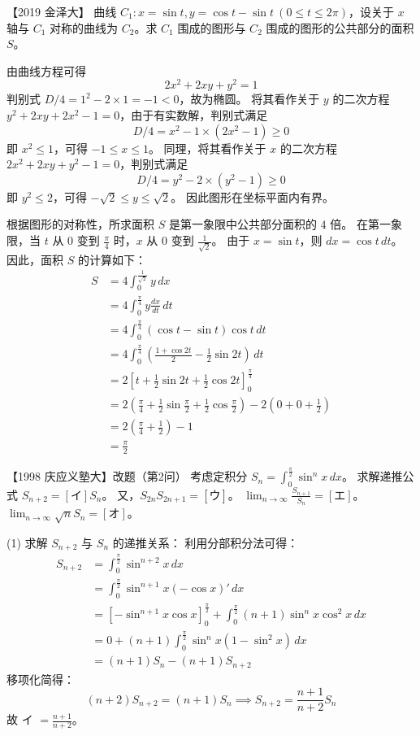 \begin{questions}
\question
【2019 金泽大】
曲线 $C_1: x = \sin t, y = \cos t - \sin t \ (0 \le t \le 2\pi)$，设关于 $x$ 轴与 $C_1$ 对称的曲线为 $C_2$。求 $C_1$ 围成的图形与 $C_2$ 围成的图形的公共部分的面积 $S$。
\begin{solution}
由曲线方程可得
\[
2x^2+2xy+y^2=1
\]
判别式 $D/4 = 1^2 - 2 \times 1 = -1 < 0$，故为椭圆。
将其看作关于 $y$ 的二次方程 $y^2+2xy+2x^2-1=0$，由于有实数解，判别式满足
\[
D/4 = x^2 - 1 \times (2x^2 - 1) \ge 0
\]
即 $x^2 \le 1$，可得 $-1 \le x \le 1$。
同理，将其看作关于 $x$ 的二次方程 $2x^2+2xy+y^2-1=0$，判别式满足
\[
D/4 = y^2 - 2 \times (y^2 - 1) \ge 0
\]
即 $y^2 \le 2$，可得 $-\sqrt{2} \le y \le \sqrt{2}$。
因此图形在坐标平面内有界。

根据图形的对称性，所求面积 $S$ 是第一象限中公共部分面积的 $4$ 倍。
在第一象限，当 $t$ 从 $0$ 变到 $\frac{\pi}{4}$ 时，$x$ 从 $0$ 变到 $\frac{1}{\sqrt{2}}$。
由于 $x = \sin t$，则 $dx = \cos t \,dt$。
因此，面积 $S$ 的计算如下：
\begin{align*}
S &= 4 \int_{0}^{\frac{1}{\sqrt{2}}} y \,dx \\
&= 4 \int_{0}^{\frac{\pi}{4}} y \frac{dx}{dt} \,dt \\
&= 4 \int_{0}^{\frac{\pi}{4}} (\cos t - \sin t) \cos t \,dt \\
&= 4 \int_{0}^{\frac{\pi}{4}} \left( \frac{1+\cos 2t}{2} - \frac{1}{2}\sin 2t \right) \,dt \\
&= 2 \left[ t + \frac{1}{2}\sin 2t + \frac{1}{2}\cos 2t \right]_{0}^{\frac{\pi}{4}} \\
&= 2 \left( \frac{\pi}{4} + \frac{1}{2}\sin\frac{\pi}{2} + \frac{1}{2}\cos\frac{\pi}{2} \right) - 2 \left( 0 + 0 + \frac{1}{2} \right) \\
&= 2 \left( \frac{\pi}{4} + \frac{1}{2} \right) - 1 \\
&= \frac{\pi}{2}
\end{align*}
\end{solution}

\question
【1998 庆应义塾大】改题（第2问）
考虑定积分 $S_n = \int_0^{\frac{\pi}{2}} \sin^n x \, dx$。
求解递推公式 $S_{n+2} = [\text{イ}] S_n$。
又，$S_{2n} S_{2n+1} = [\text{ウ}]$。
$\lim_{n \to \infty} \frac{S_{n+1}}{S_n} = [\text{エ}]$。
$\lim_{n \to \infty} \sqrt{n} S_n = [\text{オ}]$。

\begin{solution}
(1) 求解 $S_{n+2}$ 与 $S_n$ 的递推关系：
利用分部积分法可得：
\begin{align*}
S_{n+2} &= \int_0^{\frac{\pi}{2}} \sin^{n+2} x \, dx \\
&= \int_0^{\frac{\pi}{2}} \sin^{n+1} x (-\cos x)' \, dx \\
&= \left[ -\sin^{n+1} x \cos x \right]_0^{\frac{\pi}{2}} + \int_0^{\frac{\pi}{2}} (n+1) \sin^n x \cos^2 x \, dx \\
&= 0 + (n+1) \int_0^{\frac{\pi}{2}} \sin^n x (1 - \sin^2 x) \, dx \\
&= (n+1) S_n - (n+1) S_{n+2}
\end{align*}
移项化简得：
\[
(n+2) S_{n+2} = (n+1) S_n \implies S_{n+2} = \frac{n+1}{n+2} S_n
\]
故 イ $= \frac{n+1}{n+2}$。


\end{solution}
\end{questions}
